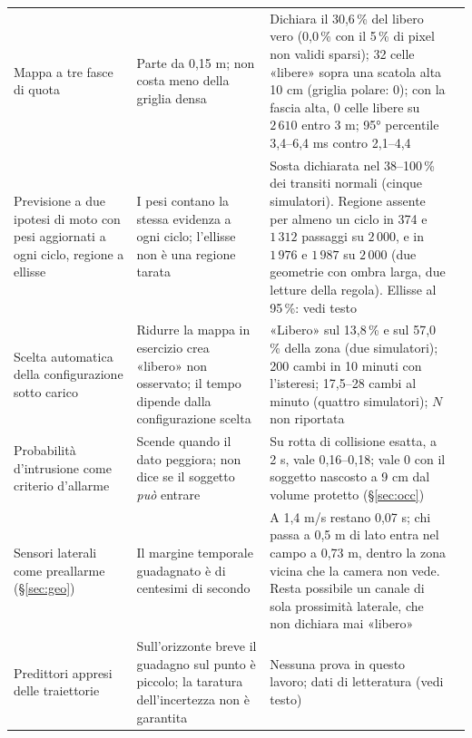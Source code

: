 \begin{table}[H]
\begin{tabularx}{\textwidth}{@{}>{\RaggedRight\arraybackslash}p{3.3cm}>{\RaggedRight\arraybackslash}p{4.4cm}Lc@{}}
Mappa a tre fasce di quota & Parte da 0,15 m; non costa meno della griglia densa & Dichiara il 30,6\,\% del libero vero (0,0\,\% con il 5\,\% di pixel non validi sparsi); 32 celle «libere» sopra una scatola alta 10 cm (griglia polare: 0); con la fascia alta, 0 celle libere su $2\,610$ entro 3 m; 95° percentile 3,4--6,4 ms contro 2,1--4,4 &  \\
Previsione a due ipotesi di moto con pesi aggiornati a ogni ciclo, regione a ellisse & I pesi contano la stessa evidenza a ogni ciclo; l'ellisse non è una regione tarata & Sosta dichiarata nel 38--100\,\% dei transiti normali (cinque simulatori). Regione assente per almeno un ciclo in 374 e $1\,312$ passaggi su $2\,000$, e in $1\,976$ e $1\,987$ su $2\,000$ (due geometrie con ombra larga, due letture della regola). Ellisse al 95\,\%: vedi testo & \\
Scelta automatica della configurazione sotto carico & Ridurre la mappa in esercizio crea «libero» non osservato; il tempo dipende dalla configurazione scelta & «Libero» sul 13,8\,\% e sul 57,0\,\% della zona (due simulatori); 200 cambi in 10 minuti con l'isteresi; 17,5--28 cambi al minuto (quattro simulatori); $N$ non riportata & \\
Probabilità d'intrusione come criterio d'allarme & Scende quando il dato peggiora; non dice se il soggetto \emph{può} entrare & Su rotta di collisione esatta, a 2 s, vale 0,16--0,18; vale 0 con il soggetto nascosto a 9 cm dal volume protetto (\S\ref{sec:occ}) &  \\
Sensori laterali come preallarme (\S\ref{sec:geo}) & Il margine temporale guadagnato è di centesimi di secondo & A 1,4 m/s restano 0,07 s; chi passa a 0,5 m di lato entra nel campo a 0,73 m, dentro la zona vicina che la camera non vede. Resta possibile un canale di sola prossimità laterale, che non dichiara mai «libero» & \\
Predittori appresi delle traiettorie & Sull'orizzonte breve il guadagno sul punto è piccolo; la taratura dell'incertezza non è garantita & Nessuna prova in questo lavoro; dati di letteratura \cite{scholler2020,cheraghipouria2026} (vedi testo) & \\\bottomrule
\end{tabularx}
\end{table}

